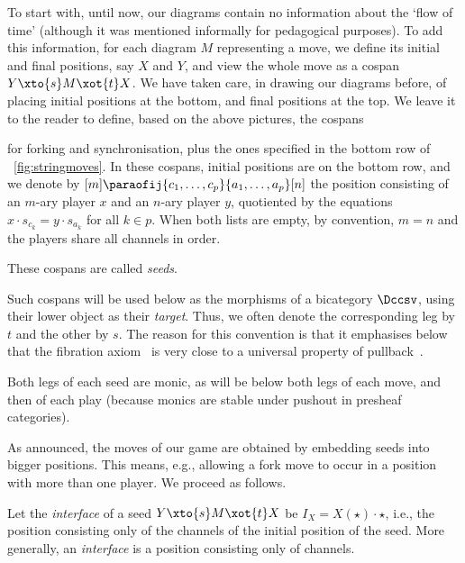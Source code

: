\documentclass{LMCS}
\theoremstyle{plain}\newtheorem{satz}[thm]{Satz}
\begin{document}
To start with, until now, our diagrams contain no information about
the `flow of time' (although it was mentioned informally for
pedagogical purposes). To add this information, for each diagram $M$
representing a move, we define its initial and final positions, say
$X$ and $Y$, and view the whole move as a cospan $Y \xto{s} M \xot{t}
X$. We have taken care, in drawing our diagrams before, of placing
initial positions at the bottom, and final positions at the top.  We
leave it to the reader to define, based on the above pictures, the
cospans
for forking and synchronisation, plus the ones specified in the bottom
row of \figurename~\ref{fig:stringmoves}.  In these cospans, initial
positions are on the bottom row, and we denote by
$[m] \paraofij{c_1,\ldots,c_p}{a_1,\ldots,a_p} [n]$ the position
consisting of an $m$-ary player $x$ and an $n$-ary player $y$,
quotiented by the equations $x \cdot s_{c_k} = y \cdot s_{a_k}$ for
all $k \in p$. When both lists are empty, by convention, $m=n$ and the
players share all channels in order.
\begin{defi}
  These cospans are called \emph{seeds}. 
\end{defi} 
\begin{rem}
  Such cospans will be used below as the morphisms of a bicategory
  $\Dccsv$, using their lower object as their \emph{target}. Thus, we
  often denote the corresponding leg by $t$ and the other by $s$.  The
  reason for this convention is that it emphasises below that the
  fibration axiom~ is very close to a universal
  property of pullback~\cite{Jacobs}.
\end{rem}
\begin{rem}
  Both legs of each seed are monic, as will be below both legs of each
  move, and then of each play (because monics are stable under pushout
  in presheaf categories).
\end{rem}

As announced, the moves of our game are obtained by embedding seeds
into bigger positions. This means, e.g., allowing a fork move to occur
in a position with more than one player. We proceed as follows.
\begin{defi}\label{def:interface}
  Let the \emph{interface} of a seed $Y \xto{s} M \xot{t} X$ be $I_X =
  X(\star) \cdot \star$, i.e., the position consisting only of the
  channels of the initial position of the seed.  More generally, an
  \emph{interface} is a position consisting only of channels.
\end{defi}
\end{document}

